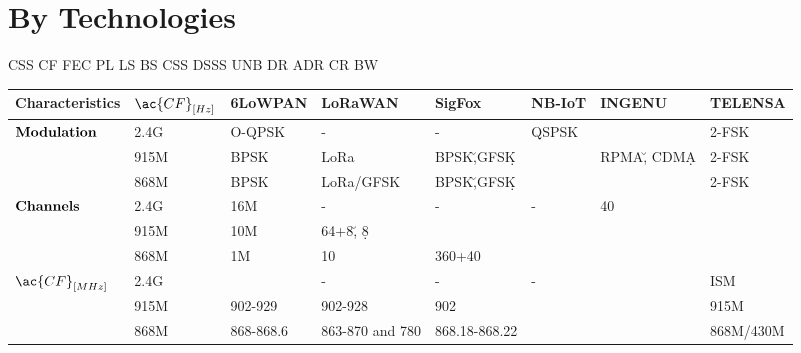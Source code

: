 \onecolumn
\section{By Technologies}
\setlength{\hoffset}{-.5in}

\ac{CSS} \ac{CF} \ac{FEC}  \ac{PL} \ac{LS} \ac{BS} \ac{CSS} \ac{DSSS} \ac{UNB} \ac{DR} \ac{ADR} \ac{CR} \ac{BW}


\begin{longtable}{l|l|l|l|l|l|l|l}
	\bf{Characteristics}               & $\ac{CF}_{[Hz]}$ & \bf{6LoWPAN} & \bf{LoRaWAN}     & \bf{SigFox}   & \bf{NB-IoT} & \textbf{INGENU}    & \textbf{TELENSA}\\\hline
	\multirow{3}{*}{$\bf{Modulation}$} & 2.4G             & O-QPSK       & -                & -             & QSPSK       &                    & 2-FSK           \\
	\                                  & 915M             & BPSK         & LoRa             & BPSK\u,GFSK\d &             & RPMA\u,	CDMA\d     & 2-FSK           \\
	\                                  & 868M             & BPSK         & LoRa/GFSK        & BPSK\u,GFSK\d &             &                    & 2-FSK           \\\hline
	\multirow{3}{*}{$\bf{Channels}$}   & 2.4G             & 16M          & -                & -             & -           & 40                 & \ko             \\
	\                                  & 915M             & 10M          & 64+8\u, 8\d      & \ko           & \ko         & \ko                & \ko             \\
	\                                  & 868M             & 1M           & 10               & 360+40        & \ko         & \ko                & \ko             \\\hline
	\multirow{2}{*}{$\ac{CF}_{[MHz]}$} & 2.4G             & \ko          & -                & -             & -           & \ko                & ISM             \\
	\                                  & 915M             & 902-929      & 902-928          & 902           & \ko         & \ko                & 915M            \\
	\                                  & 868M             & 868-868.6    & 863-870 and 780  & 868.18-868.22 & \ko         & \ko                & 868M/430M       \\\hline

\end{longtable}
